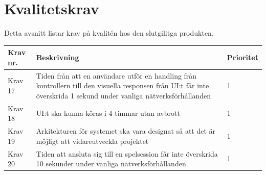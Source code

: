 \documentclass[10pt]{article}
\begin{document}
\section{Kvalitetskrav}
	Detta avsnitt listar krav på kvalitén hos den slutgilitga produkten.
	
		\begin{tabular}{|p{2cm}|p{8cm}|p{2cm}|}
		\hline
		\textbf{Krav nr.} & \textbf{Beskrivning} & \textbf{Prioritet} \\ \hline
		Krav 17 & Tiden från att en användare utför en handling från kontrollern till den visuella responsen från UI:t får inte överskrida 1 sekund under vanliga nätverksförhållanden & 1\\ \hline
		Krav 18 & UI:t ska kunna köras i 4 timmar utan avbrott & 1 \\ \hline
		Krav 19 & Arkitekturen för systemet ska vara designat så att det är möjligt att vidareutveckla projektet & 1 \\ \hline
		Krav 20 & Tiden att ansluta sig till en spelsession får inte överskrida 10 sekunder under vanliga nätverksförhållanden & 1 \\ \hline
		
	\end{tabular}
\end{document}
